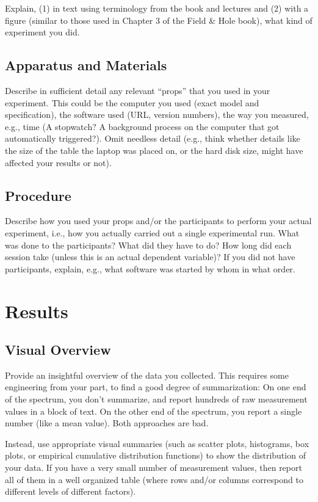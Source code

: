 \documentclass{article}
\begin{document}
Explain, (1) in text using terminology from the book and lectures and (2) with a figure (similar to those used in Chapter 3 of the Field \& Hole book), what kind of experiment you did.

\subsection{Apparatus and Materials}
Describe in sufficient detail any relevant “props” that you used in your experiment. This could be the computer you used (exact model and specification), the software used (URL, version numbers), the way you measured, e.g., time (A stopwatch? A background process on the computer that got automatically triggered?). Omit needless detail (e.g., think whether details like the size of the table the laptop was placed on, or the hard disk size, might have affected your results or not).

\subsection{Procedure}
Describe how you used your props and/or the participants to perform your actual experiment, i.e., how you actually carried out a single experimental run. What was done to the participants? What did they have to do? How long did each session take (unless this is an actual dependent variable)? If you did not have participants, explain, e.g., what software was started by whom in what order.

\section{Results}
\subsection{Visual Overview}
Provide an insightful overview of the data you collected. This requires some engineering from your part, to find a good degree of summarization: On one end of the spectrum, you don't summarize, and report hundreds of raw measurement values in a block of text. On the other end of the spectrum, you report a single number (like a mean value). Both approaches are bad.

Instead, use appropriate visual summaries (such as scatter plots, histograms, box plots, or empirical cumulative distribution functions) to show the distribution of your data. If you have a very small number of measurement values, then report all of them in a well organized table (where rows and/or columns correspond to different levels of different factors).
\end{document}
